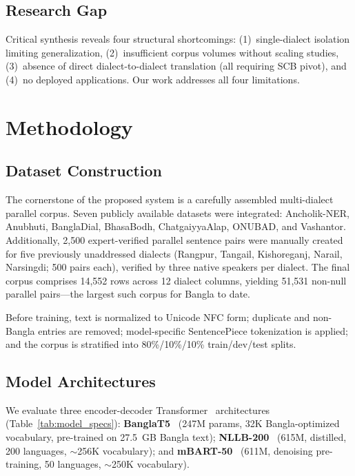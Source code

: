 \documentclass[conference]{IEEEtran}
\begin{document}
\subsection{Research Gap}
Critical synthesis reveals four structural shortcomings: (1)~single-dialect isolation limiting generalization, (2)~insufficient corpus volumes without scaling studies, (3)~absence of direct dialect-to-dialect translation (all requiring SCB pivot), and (4)~no deployed applications. Our work addresses all four limitations.

\section{Methodology}

\subsection{Dataset Construction}
The cornerstone of the proposed system is a carefully assembled multi-dialect parallel corpus. Seven publicly available datasets were integrated: Ancholik-NER, Anubhuti, BanglaDial, BhasaBodh, ChatgaiyyaAlap, ONUBAD, and Vashantor. Additionally, 2,500 expert-verified parallel sentence pairs were manually created for five previously unaddressed dialects (Rangpur, Tangail, Kishoreganj, Narail, Narsingdi; 500 pairs each), verified by three native speakers per dialect. The final corpus comprises 14,552 rows across 12 dialect columns, yielding 51,531 non-null parallel pairs---the largest such corpus for Bangla to date.

Before training, text is normalized to Unicode NFC form; duplicate and non-Bangla entries are removed; model-specific SentencePiece tokenization is applied; and the corpus is stratified into 80\%/10\%/10\% train/dev/test splits.

\subsection{Model Architectures}
We evaluate three encoder-decoder Transformer~\cite{vaswani2017attention} architectures (Table~\ref{tab:model_specs}): \textbf{BanglaT5}~\cite{bhattacharjee-etal-2023-banglanlg} (247M params, 32K Bangla-optimized vocabulary, pre-trained on 27.5~GB Bangla text); \textbf{NLLB-200}~\cite{nllb2022} (615M, distilled, 200 languages, $\sim$256K vocabulary); and \textbf{mBART-50}~\cite{tang2020multilingual} (611M, denoising pre-training, 50 languages, $\sim$250K vocabulary).
\end{document}
